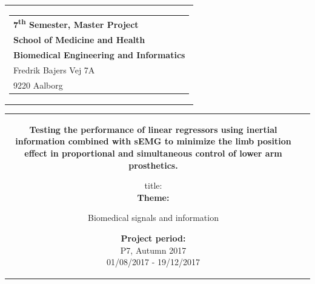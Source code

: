 % 
\thispagestyle{empty}
\begin{titlepage}
\begin{nopagebreak}
{\samepage 

\begin{tabular}{r}
\parbox{\textwidth}{  
\hfill \hspace{2cm} \parbox{8cm}{\begin{tabular}{l} %
{\small \textbf{\textcolor{aaublue}{{7\textsuperscript{th} Semester, Master Project}}}}\\
{\small \textbf{\textcolor{aaublue}{School of Medicine and Health}}}\\
{\small \textbf{\textcolor{aaublue}{Biomedical Engineering and Informatics}}}\\
{\small \textcolor{aaublue}{Fredrik Bajers Vej 7A}} \\
{\small \textcolor{aaublue}{9220 Aalborg}} \\
\end{tabular}}}
\end{tabular}

\begin{tabular}{cc}
\parbox{7cm}{

\textbf{Testing the performance of linear regressors using inertial information combined with sEMG to minimize the limb position effect in proportional and simultaneous control of lower arm prosthetics.}

title:\\ 

\textbf{Theme: }

\small{
Biomedical signals and information\\
}


\parbox{8cm}{


\textbf{Project period:}\\
P7, Autumn 2017\\
01/08/2017 - 19/12/2017\\
   
}}
\end{tabular}}
\end{nopagebreak}
\end{titlepage}
